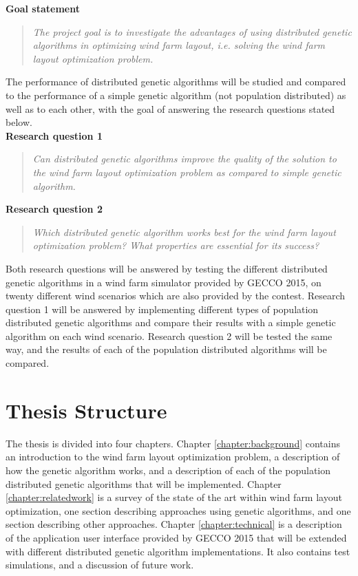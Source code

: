 \noindent \textbf{Goal statement}

\begin{quote}
\textit{The project goal is to investigate the advantages of using distributed genetic algorithms in optimizing wind farm layout, i.e. solving the wind farm layout optimization problem.} \citep{Samorani}
\end{quote}

\noindent The performance of distributed genetic algorithms will be studied and compared to the performance of a simple genetic algorithm (not population distributed) as well as to each other, with the goal of answering the research questions stated below.\\

\noindent \textbf{Research question 1}

\begin{quote}
\textit{Can distributed genetic algorithms improve the quality of the solution to the wind farm layout optimization problem as compared to simple genetic algorithm.}
\end{quote}

\noindent \textbf{Research question 2}

\begin{quote}
\textit{Which distributed genetic algorithm works best for the wind farm layout optimization problem? What properties are essential for its success?}
\end{quote}

\noindent Both research questions will be answered by testing the different distributed genetic algorithms in a wind farm simulator provided by GECCO 2015, on twenty different wind scenarios which are also provided by the contest. Research question 1 will be answered by implementing different types of population distributed genetic algorithms and compare their results with a simple genetic algorithm on each wind scenario. Research question 2 will be tested the same way, and the results of each of the population distributed algorithms will be compared.


\section{Thesis Structure}\label{thesisstructure}
The thesis is divided into four chapters. Chapter \ref{chapter:background} contains an introduction to the wind farm layout optimization problem, a description of how the genetic algorithm works, and a description of each of the population distributed genetic algorithms that will be implemented. Chapter \ref{chapter:relatedwork} is a survey of the state of the art within wind farm layout optimization, one section describing approaches using genetic algorithms, and one section describing other approaches. Chapter \ref{chapter:technical} is a description of the application user interface provided by GECCO 2015 that will be extended with different distributed genetic algorithm implementations. It also contains test simulations, and a discussion of future work. 